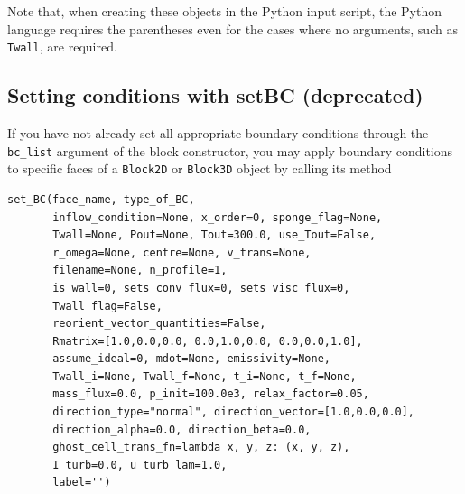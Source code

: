 Note that, 
when creating these objects in the Python input script, the Python language requires the parentheses
even for the cases where no arguments, such as \texttt{Twall}, are required.
  
\subsection{Setting conditions with setBC (deprecated)}
\label{setting-individual-boundary-conditions-sec}
%
If you have not already set all appropriate boundary conditions through the \verb!bc_list!
argument of the block constructor, you may apply boundary conditions to specific faces 
of a \texttt{Block2D} or \texttt{Block3D} object by calling its method

\noindent
\begin{verbatim}
set_BC(face_name, type_of_BC,
       inflow_condition=None, x_order=0, sponge_flag=None,
       Twall=None, Pout=None, Tout=300.0, use_Tout=False,
       r_omega=None, centre=None, v_trans=None, 
       filename=None, n_profile=1,
       is_wall=0, sets_conv_flux=0, sets_visc_flux=0,
       Twall_flag=False,
       reorient_vector_quantities=False, 
       Rmatrix=[1.0,0.0,0.0, 0.0,1.0,0.0, 0.0,0.0,1.0],
       assume_ideal=0, mdot=None, emissivity=None,
       Twall_i=None, Twall_f=None, t_i=None, t_f=None,
       mass_flux=0.0, p_init=100.0e3, relax_factor=0.05,
       direction_type="normal", direction_vector=[1.0,0.0,0.0],
       direction_alpha=0.0, direction_beta=0.0,
       ghost_cell_trans_fn=lambda x, y, z: (x, y, z),
       I_turb=0.0, u_turb_lam=1.0,
       label='')
\end{verbatim}

